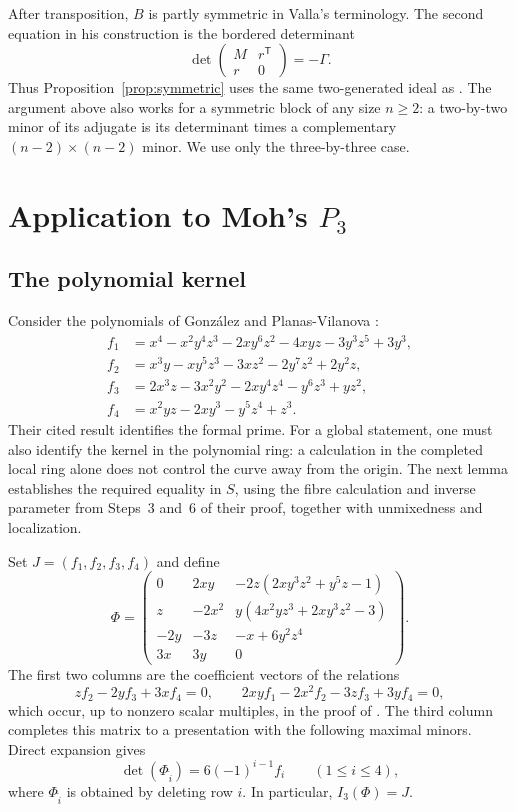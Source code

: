 \documentclass[11pt]{amsart}
\theoremstyle{remark}
\begin{document}
After transposition, $B$ is partly symmetric in Valla's terminology. The second equation in his construction is the bordered determinant
\[
 \det\begin{pmatrix}M&r^{\mathsf T}\\r&0\end{pmatrix}=-\Gamma.
\]
Thus Proposition~\ref{prop:symmetric} uses the same two-generated ideal as \cite[Theorem~2.1]{Valla1980}. The argument above also works for a symmetric block of any size $n\geq2$: a two-by-two minor of its adjugate is its determinant times a complementary $(n-2)\times(n-2)$ minor. We use only the three-by-three case.

\section{Application to Moh's \texorpdfstring{$P_3$}{P3}}\label{sec:moh}

\subsection{The polynomial kernel}

Consider the polynomials of Gonz\'alez and Planas-Vilanova \cite[Theorem~4.7]{GonzalezPlanas2026}:
\begin{align*}
 f_1&=x^4-x^2y^4z^3-2xy^6z^2-4xyz-3y^3z^5+3y^3,\\
 f_2&=x^3y-xy^5z^3-3xz^2-2y^7z^2+2y^2z,\\
 f_3&=2x^3z-3x^2y^2-2xy^4z^4-y^6z^3+yz^2,\\
 f_4&=x^2yz-2xy^3-y^5z^4+z^3.
\end{align*}
Their cited result identifies the formal prime. For a global statement, one must also identify the kernel in the polynomial ring: a calculation in the completed local ring alone does not control the curve away from the origin. The next lemma establishes the required equality in $S$, using the fibre calculation and inverse parameter from Steps~3 and~6 of their proof, together with unmixedness and localization.

Set $J=(f_1,f_2,f_3,f_4)$ and define
\begin{equation}\label{eq:Phi}
 \Phi=\begin{pmatrix}
 0&2xy&-2z(2xy^3z^2+y^5z-1)\\
 z&-2x^2&y(4x^2yz^3+2xy^3z^2-3)\\
 -2y&-3z&-x+6y^2z^4\\
 3x&3y&0
 \end{pmatrix}.
\end{equation}
The first two columns are the coefficient vectors of the relations
\[
 zf_2-2yf_3+3xf_4=0,\qquad
 2xyf_1-2x^2f_2-3zf_3+3yf_4=0,
\]
which occur, up to nonzero scalar multiples, in the proof of \cite[Proposition~5.6]{GonzalezPlanas2026}. The third column completes this matrix to a presentation with the following maximal minors. Direct expansion gives
\begin{equation}\label{eq:Phi-minors}
 \det(\Phi_{\widehat i})=6(-1)^{i-1}f_i
 \qquad(1\leq i\leq4),
\end{equation}
where $\Phi_{\widehat i}$ is obtained by deleting row $i$. In particular, $I_3(\Phi)=J$.
\end{document}
